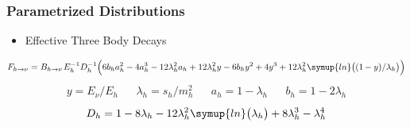 	\begin{frame}
		\addtocounter{framenumber}{-1}
		\frametitle{Parametrized Distributions}
		\begin{itemize}
			\item Effective Three Body Decays
		\end{itemize}
			\begin{align*}
				F_{h \rightarrow \nu} = B_{h \rightarrow \nu} \kern+1pt E_h^{-1} D_h^{-1}
				\Bigl( 6b_ha_h^2 - 4a_h^3 - 12\lambda_h^2a_h + 12\lambda_h^2y - 6b_hy^2 + 4y^3 + 12\lambda_h^2
				\symup{ln} \bigl( (1 \kern-0.5pt - y) / \lambda_h \bigr) \Bigr)
			\end{align*}
			\begin{align*}
				&&&&&& y = E_\nu / E_h && \lambda_h = s_h / m_h^2 && a_h = 1 - \lambda_h && b_h = 1 - 2\lambda_h &&&&&&
			\end{align*}
			\begin{align*}
				D_h = 1 - 8\lambda_h - 12\lambda_h^2 \symup{ln} \bigl( \lambda_h \bigr) +
				8\lambda_h^3 - \lambda_h^4
			\end{align*}
	\end{frame}

